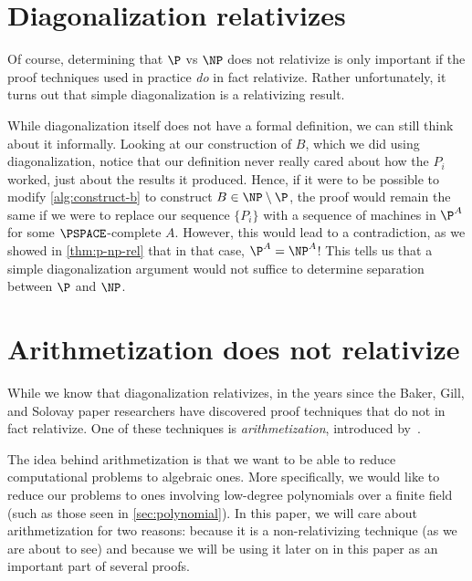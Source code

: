 \documentclass[english,12pt]{reedthesis}
\theoremstyle{plain}
\theoremstyle{definition}
\theoremstyle{remark}
\begin{document}
\section{Diagonalization relativizes}\label{sec:diag-relativizes}

Of course, determining that $\P$ vs $\NP$ does not relativize is only important
if the proof techniques used in practice \emph{do} in fact relativize. Rather
unfortunately, it turns out that simple diagonalization is a relativizing
result.

While diagonalization itself does not have a formal definition, we can still
think about it informally. Looking at our construction of $B$, which we did
using diagonalization, notice that our definition never really cared about how
the $P_{i}$ worked, just about the results it produced. Hence, if it were to be
possible to modify \cref{alg:construct-b} to construct $B \in \NP \setminus \P$, the proof
would remain the same if we were to replace our sequence $\{P_{i}\}$ with a
sequence of machines in $\P^{A}$ for some $\PSPACE$-complete $A$. However, this
would lead to a contradiction, as we showed in \cref{thm:p-np-rel} that in that
case, $\P^{A} = \NP^{A}$! This tells us that a simple diagonalization argument
would not suffice to determine separation between $\P$ and $\NP$.

\section{Arithmetization does not relativize}\label{sec:arith-non-rel}

While we know that diagonalization relativizes, in the years since the Baker,
Gill, and Solovay paper researchers have discovered proof techniques that do not
in fact relativize. One of these techniques is
\emph{arithmetization}, introduced by~\cite{BF91}.

The idea behind arithmetization is that we want to be able to reduce
computational problems to algebraic ones. More specifically, we would like to
reduce our problems to ones involving low-degree polynomials over a finite field
(such as those seen in \cref{sec:polynomial}). In this paper, we will care about
arithmetization for two reasons: because it is a non-relativizing technique (as
we are about to see) and because we will be using it later on in this paper as
an important part of several proofs. %

\end{document}
